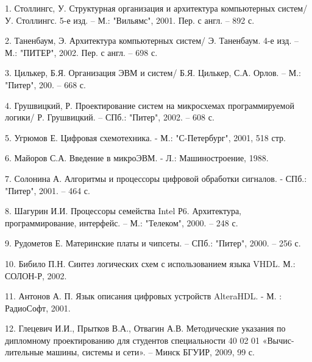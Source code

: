 

1. Столлингс, У. Структурная организация и архитектура компьютерных
систем/ У. Столлингс. 5-е изд. – М.: "Вильямс", 2001. Пер. с англ. – 892 с.

2. Таненбаум, Э. Архитектура компьютерных систем/ Э. Таненбаум. 4-е
изд. – М.: "ПИТЕР", 2002. Пер. с англ. – 698 с.

3. Цилькер, Б.Я. Организация ЭВМ и систем/ Б.Я. Цилькер, С.А. Орлов. –
М.: "Питер", 200. – 668 с.

4. Грушвицкий, Р. Проектирование систем на микросхемах программируемой логики/ Р. Грушвицкий. – СПб.: "Питер", 2002. – 608 с.

5. Угрюмов Е. Цифровая схемотехника. - М.: "С-Петербург", 2001, 518 стр.

6. Майоров С.А. Введение в микроЭВМ. - Л.: Машиностроение, 1988.

7. Солонина А. Алгоритмы и процессоры цифровой обработки сигналов. -
СПб.: "Питер", 2001. – 464 с.

8. Шагурин И.И. Процессоры семейства Intel Р6. Архитектура, программирование, интерфейс. – М.: "Телеком", 2000. – 248 с.

9. Рудометов Е. Материнские платы и чипсеты. – СПб.: "Питер", 2000. –
256 с.

10. Бибило П.Н. Синтез логических схем с использованием языка VHDL.
М.: СОЛОН-Р, 2002.

11. Антонов А. П. Язык описания цифровых устройств AlteraHDL. - М. :
РадиоСофт, 2001.

12. Глецевич И.И., Прытков В.А., Отвагин А.В. Методические указания по
дипломному проектированию для студентов специальности 40 02 01 «Вычис-
лительные машины, системы и сети». – Минск БГУИР, 2009, 99 с.
% 
